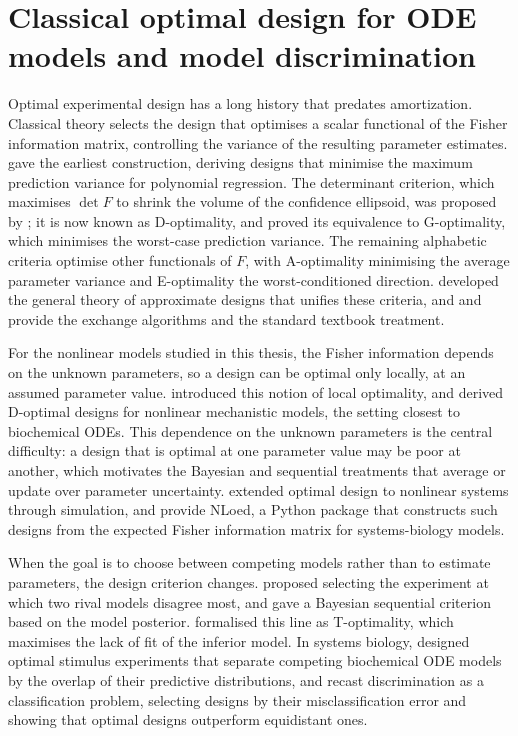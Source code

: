 \section{Classical optimal design for ODE models and model discrimination}
\label{sec:rw-classical}

Optimal experimental design has a long history that predates amortization. Classical theory
selects the design that optimises a scalar functional of the Fisher information matrix,
controlling the variance of the resulting parameter estimates. \citet{smith1918standard}
gave the earliest construction, deriving designs that minimise the maximum prediction
variance for polynomial regression. The determinant criterion, which maximises $\det F$ to
shrink the volume of the confidence ellipsoid, was proposed by \citet{wald1943efficient}; it
is now known as D-optimality, and \citet{kiefer1960equivalence} proved its equivalence to
G-optimality, which minimises the worst-case prediction variance. The remaining alphabetic
criteria optimise other functionals of $F$, with A-optimality minimising the average parameter
variance and E-optimality the worst-conditioned direction. \citet{kiefer1959optimum} developed the general theory of approximate designs that
unifies these criteria, and \citet{fedorov1972theory} and \citet{atkinson1992optimum} provide
the exchange algorithms and the standard textbook treatment.

For the nonlinear models studied in this thesis, the Fisher information depends on the unknown
parameters, so a design can be optimal only locally, at an assumed parameter value.
\citet{chernoff1953locally} introduced this notion of local optimality, and
\citet{box1959design} derived D-optimal designs for nonlinear mechanistic models,
the setting closest to biochemical ODEs. This dependence on the unknown parameters is the
central difficulty: a design that is optimal at one parameter value may be poor at another,
which motivates the Bayesian and sequential treatments that average or update over parameter
uncertainty. \citet{huan2014simulation} extended optimal design to nonlinear systems through
simulation, and \citet{braniff2022nloed} provide NLoed, a Python package that constructs such
designs from the expected Fisher information matrix for systems-biology models.

When the goal is to choose between competing models rather than to estimate parameters, the
design criterion changes. \citet{hunter1965designs} proposed selecting the experiment at which
two rival models disagree most, and \citet{box1967discrimination} gave a Bayesian sequential
criterion based on the model posterior. \citet{atkinson1975discriminating2} formalised this
line as T-optimality, which maximises the lack of fit of the inferior model. In systems
biology, \citet{flassig2012optimal} designed optimal stimulus experiments that separate
competing biochemical ODE models by the overlap of their predictive distributions, and
\citet{hainy2022optimal} recast discrimination as a classification problem, selecting designs
by their misclassification error and showing that optimal designs outperform equidistant ones.

